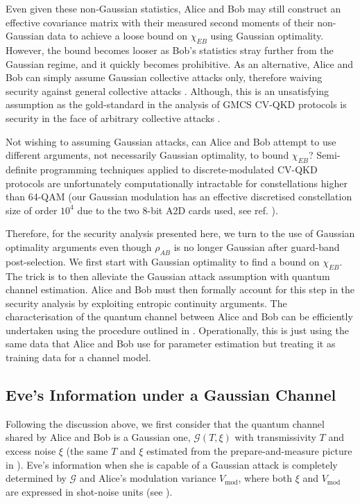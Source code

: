 ﻿\documentclass[12pt]{article}
\begin{document}
Even given these non-Gaussian statistics, Alice and Bob may still construct an effective covariance matrix with their measured second moments of their non-Gaussian data to achieve a loose bound on $\chi_{EB}$ using Gaussian optimality. However, the bound becomes looser as Bob's statistics stray further from the Gaussian regime, and it quickly becomes prohibitive. As an alternative, Alice and Bob can simply assume Gaussian collective attacks only, therefore waiving security against general collective attacks \cite{Heid-2007}. Although, this is an unsatisfying assumption as the gold-standard in the analysis of GMCS CV-QKD protocols is security in the face of arbitrary collective attacks \cite{Diamanti-2015}.

Not wishing to assuming Gaussian attacks, can Alice and Bob attempt to use different arguments, not necessarily Gaussian optimality, to bound $\chi_{EB}$? Semi-definite programming techniques applied to discrete-modulated CV-QKD protocols are unfortunately computationally intractable for constellations higher than 64-QAM \cite{Ghorai-2019} (our Gaussian modulation has an effective discretised constellation size of order $10^4$ due to the two 8-bit A2D cards used, see ref. \cite{Weerasinghe-2023}).

Therefore, for the security analysis presented here, we turn to the use of Gaussian optimality arguments even though $\rho_{AB}$ is no longer Gaussian after guard-band post-selection. We first start with Gaussian optimality to find a bound on $\chi_{EB}$. The trick is to then alleviate the Gaussian attack assumption with quantum channel estimation. Alice and Bob must then formally account for this step in the security analysis by exploiting entropic continuity arguments. The characterisation of the quantum channel between Alice and Bob can be efficiently undertaken using the procedure outlined in . Operationally, this is just using the same data that Alice and Bob use for parameter estimation but treating it as training data for a channel model.

\subsection{Eve's Information under a Gaussian Channel}\label{subsec: eves information}

Following the discussion above, we first consider that the quantum channel shared by Alice and Bob is a Gaussian one, $\mathcal{G}(T, \xi)$ with transmissivity $T$ and excess noise $\xi$ (the same $T$ and $\xi$ estimated from the prepare-and-measure picture in ). Eve's information when she is capable of a Gaussian attack is completely determined by $\mathcal{G}$ and Alice's modulation variance $V_\text{mod}$, where both $\xi$ and $V_\text{mod}$ are expressed in shot-noise units (see ).
\end{document}

